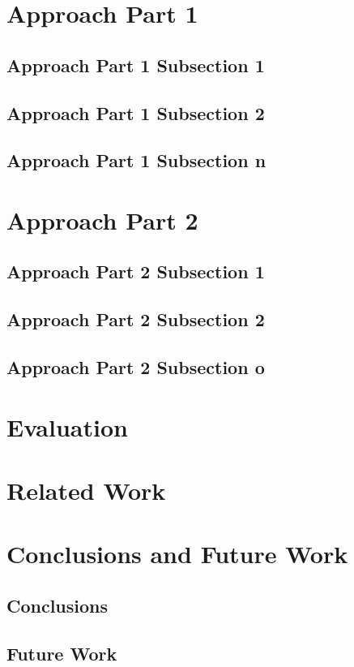 \chapter{Approach Part 1}\label{chp:Approach1}
  \section{Approach Part 1 Subsection 1}
    \blindtext
  \section{Approach Part 1 Subsection 2}
    \blindtext
  \section{Approach Part 1 Subsection n}
    \blindtext

\chapter{Approach Part 2}\label{chp:Approach2}
  \section{Approach Part 2 Subsection 1}
    \blindtext
  \section{Approach Part 2 Subsection 2}
    \blindtext
  \section{Approach Part 2 Subsection o}
    \blindtext

\chapter{Evaluation}\label{chp:Evaluation}
  \blindtext

\chapter{Related Work}\label{chp:Related}
  \blindtext

\chapter{Conclusions and Future Work}\label{chp:Conclusions}
  \section{Conclusions}
    \blindtext
  \section{Future Work}
    \blindtext


\backmatter
  \tocbibliography


